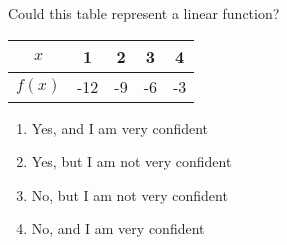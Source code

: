 \bigskip

\item Could this table represent a linear function?

\begin{tabular}{|c|c|c|c|c|}
\hline
$x$ & 1 & 2 & 3 & 4 \\
\hline
$f(x)$ & -12 & -9 & -6 & -3 \\
\hline
\end{tabular}

\begin{enumerate}
\item Yes, and I am very confident  
\item Yes, but I am not very confident
\item No, but I am not very confident
\item No, and I am very confident  
\end{enumerate}

